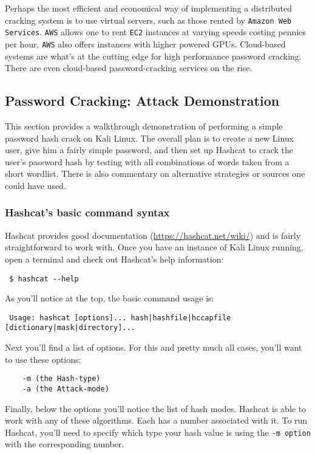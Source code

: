   Perhaps the most efficient and economical way of implementing a distributed cracking system is to use virtual servers, such as those rented by \verb|Amazon Web Services|. \verb|AWS| allows one to rent \verb|EC2| instances at varying speeds costing pennies per hour. \verb|AWS| also offers instances with higher powered GPUs. Cloud-based systems are what’s at the cutting edge for high performance password cracking. There are even cloud-based password-cracking services on the rise.

\subsection{Password Cracking: Attack Demonstration}

  This section provides a walkthrough demonstration of performing a simple password hash crack on Kali Linux. The overall plan is to create a new Linux user, give him a fairly simple password, and then set up Hashcat to crack the user’s password hash by testing with all combinations of words taken from a short wordlist. There is also commentary on alternative strategies or sources one could have used.

  \subsubsection{Hashcat’s basic command syntax}
  Hashcat provides good documentation (\url{https://hashcat.net/wiki/}) and is fairly straightforward to work with. Once you have an instance of Kali Linux running, open a terminal and check out Hashcat’s help information:
  \begin{verbatim} $ hashcat --help \end{verbatim}

  \noindent
  As you’ll notice at the top, the basic command usage is:
  \begin{verbatim} Usage: hashcat [options]... hash|hashfile|hccapfile [dictionary|mask|directory]... \end{verbatim}

  \noindent
  Next you’ll find a list of options. For this and pretty much all cases, you’ll want to use these options:
  \begin{verbatim}
    -m (the Hash-type)
    -a (the Attack-mode)
  \end{verbatim}
  \noindent
  Finally, below the options you’ll notice the list of hash modes. Hashcat is able to work with any of these algorithms. Each has a number associated with it. To run Hashcat, you’ll need to specify which type your hash value is using the \verb|-m option| with the corresponding number.

